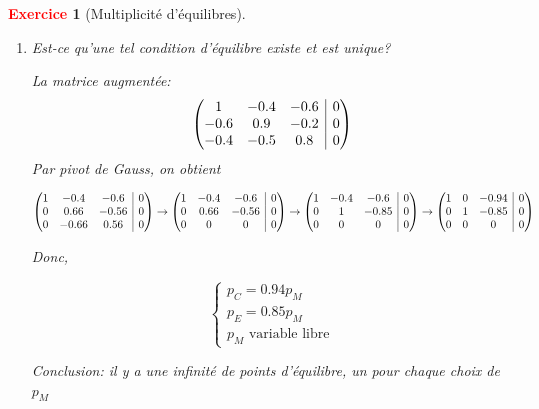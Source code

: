 \documentclass[11pt]{article}
\makeatletter
\theoremstyle{mythmstyle}
\newtheorem{exo}{\textcolor{red}{\textbf{Exercice}}}
\newenvironment{amatrix}[1]{	%
	\left(\begin{array}{@{}*{#1}{c}|c@{}}}{\end{array}\right)
}
\makeatother
\begin{document}
\begin{exo}[Multiplicité d'équilibres]
\begin{enumerate}
\begin{solution}
 

 
\end{solution}
 \item Est-ce qu'une tel condition d'équilibre existe et est unique?
\begin{solution}
La matrice augmentée:  $$
\begin{amatrix}{3} 1&-0.4& -0.6 & 0 \\ -0.6&0.9 & -0.2 & 0 \\ -0.4&-0.5 & 0.8  & 0 \end{amatrix}
$$
Par pivot de Gauss, on obtient

 $$
\begin{amatrix}{3} 1&-0.4& -0.6 & 0 \\ 0&0.66 & -0.56 & 0 \\ 0&-0.66 & 0.56  & 0 \end{amatrix}\to \begin{amatrix}{3} 1&-0.4& -0.6 & 0 \\ 0&0.66 & -0.56 & 0 \\ 0&0& 0 & 0 \end{amatrix}\to \begin{amatrix}{3} 1&-0.4& -0.6 & 0 \\ 0&1 & -0.85 & 0 \\ 0&0& 0 & 0 \end{amatrix}\to\begin{amatrix}{3} 1&0& -0.94 & 0 \\ 0&1 & -0.85 & 0 \\ 0&0& 0 & 0 \end{amatrix}
$$

Donc,

 $$
 \begin{cases}
  p_C= 0.94 p_M\\
p_E=0.85 p_M\\
p_M\text{ variable libre}
 \end{cases}
 $$


Conclusion: il y a une infinité de points d'équilibre, un pour chaque choix de $p_M$


\end{solution}
 \end{enumerate}
\end{exo}
\end{document}

